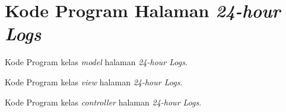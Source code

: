 \chapter{Kode Program Halaman \textit{24-hour Logs}}
\label{lamp:kodeprogramhalamanlogs}

%
%
%

Kode Program kelas \textit{model} halaman \textit{24-hour Logs}.
 

Kode Program kelas \textit{view} halaman \textit{24-hour Logs}.
 

Kode Program kelas \textit{controller} halaman \textit{24-hour Logs}.

 

